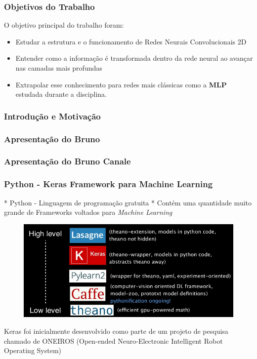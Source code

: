 \documentclass[tikz,11pt]{beamer}
\begin{document}
    \begin{frame}
	\frametitle{Objetivos do Trabalho}
	
	O objetivo principal do trabalho foram:
	
	\begin{itemize}
		\item Estudar a estrutura e o funcionamento de Redes Neurais
		Convolucionais 2D
		\item Entender como a informação é transformada dentro da
		rede neural ao avançar nas camadas mais profundas
		\item Extrapolar esse conhecimento para redes mais
		clássicas como a \textbf{MLP} estudada durante a
		disciplina.
	\end{itemize}
	\end{frame}

\begin{frame}
	\frametitle{Introdução e Motivação}
\end{frame}

\begin{frame}
	\frametitle{Apresentação do Bruno}
\end{frame}

\begin{frame}
	\frametitle{Apresentação do Bruno Canale}
\end{frame}

\begin{frame}
	\frametitle{Python - Keras Framework para Machine Learning}
	
	* Python - Linguagem de programação gratuita \newline
	* Contém uma quantidade muito grande de Frameworks voltados para
	\textit{Machine Learning}
	
	
	\begin{figure}
		\centering
		\includegraphics[scale=0.3]{road_map}
	\end{figure}
	
	Keras foi inicialmente desenvolvido como parte de um projeto de
	pesquisa chamado de ONEIROS (Open-ended Neuro-Electronic
	Intelligent Robot Operating System)
	
\end{frame}
\end{document}
